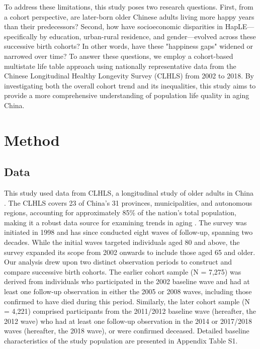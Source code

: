 \documentclass[12pt, a4paper]{article}
\begin{document}
To address these limitations, this study poses two research questions. First, from a cohort perspective, are later-born older Chinese adults living more happy years than their predecessors? Second, how have socioeconomic disparities in HapLE—specifically by education, urban-rural residence, and gender—evolved across these successive birth cohorts? In other words, have these "happiness gaps" widened or narrowed over time? To answer these questions, we employ a cohort-based multistate life table approach using nationally representative data from the Chinese Longitudinal Healthy Longevity Survey (CLHLS) from 2002 to 2018. By investigating both the overall cohort trend and its inequalities, this study aims to provide a more comprehensive understanding of population life quality in aging China.


\section{Method}
\subsection{Data}
This study used data from CLHLS, a longitudinal study of older adults in China \autocite{centerforhealthyaginganddevelopmentstudies.2020.chinese}. The CLHLS covers 23 of China’s 31 provinces, municipalities, and autonomous regions, accounting for approximately 85\% of the nation's total population, making it a robust data source for examining trends in aging \autocite{gu.2008.general,zeng.2008.introduction}. The survey was initiated in 1998 and has since conducted eight waves of follow-up, spanning two decades. While the initial waves targeted individuals aged 80 and above, the survey expanded its scope from 2002 onwards to include those aged 65 and older. Our analysis drew upon two distinct observation periods to construct and compare successive birth cohorts. The earlier cohort sample (N = 7,275) was derived from individuals who participated in the 2002 baseline wave and had at least one follow-up observation in either the 2005 or 2008 waves, including those confirmed to have died during this period. Similarly, the later cohort sample (N = 4,221) comprised participants from the 2011/2012 baseline wave (hereafter, the 2012 wave) who had at least one follow-up observation in the 2014 or 2017/2018 waves (hereafter, the 2018 wave), or were confirmed deceased. Detailed baseline characteristics of the study population are presented in Appendix Table S1.
\end{document}
